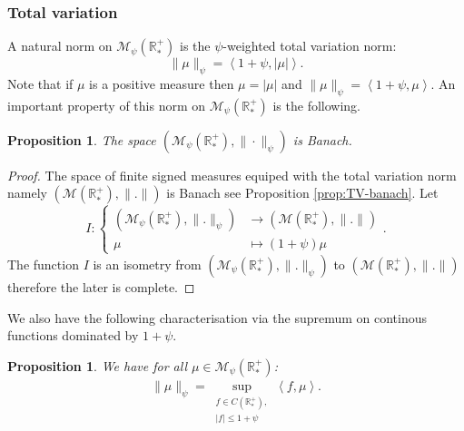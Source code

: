 \documentclass[11pt,a4paper]{article}
\newcommand{\RRP}{\mathbb{R}^+_*}
\newcommand{\MC}{\mathcal{M}}
\newcommand{\brac}[1]{\left\langle#1\right\rangle}
\newtheorem{proposition}[theorem]{Proposition}
\begin{document}
\subsubsection*{Total variation}
A natural norm on $\MC_{\psi}(\RRP)$ is the $\psi$-weighted total variation norm:
\[
\|\mu\|_{\psi} = \brac{1 + \psi, |\mu|}.
\]
Note that if $\mu$ is a positive measure then $\mu = |\mu|$ and $\|\mu\|_{\psi} = \brac{1 + \psi,\mu}$. An important property of this norm on $\MC_{\psi}(\RRP)$ is the following.
\begin{proposition}\label{prop:weighed-banach}
    The space $\left(\MC_{\psi}(\RRP),\|\cdot\|_{\psi} \right)$ is Banach.
\end{proposition}
\begin{proof}
    The space of finite signed measures equiped with the total variation norm namely \(\left(\MC\left(\RRP\right),\| .\|\right) \) is Banach see Proposition \ref{prop:TV-banach}. Let 
    \begin{equation*}
        I :
        \left\lbrace
        \begin{aligned}
            \left(\MC_{\psi}\left(\RRP\right),\| .\|_{\psi}\right) &\to \left(\MC\left(\RRP\right),\| .\|\right) \\
            \mu &\mapsto (1 +\psi) \mu
        \end{aligned}
        \right. .
    \end{equation*}
    The function $I$ is an isometry from \(\left(\MC_{\psi}\left(\RRP\right),\| .\|_{\psi}\right) \) to \(\left(\MC\left(\RRP\right),\| .\|\right) \) therefore the later is complete.
\end{proof}
We also have the following characterisation via the supremum on continous functions dominated by $1 + \psi$.
\begin{proposition}
    We have for all $\mu \in \MC_{\psi}(\RRP)$:
    \begin{align*}
        \|\mu\|_{\psi} = \sup\limits_{\substack{f \in C(\RRP), \\ |f| \leq 1 + \psi}} \brac{f,\mu}.
    \end{align*}
\end{proposition}
\end{document}
